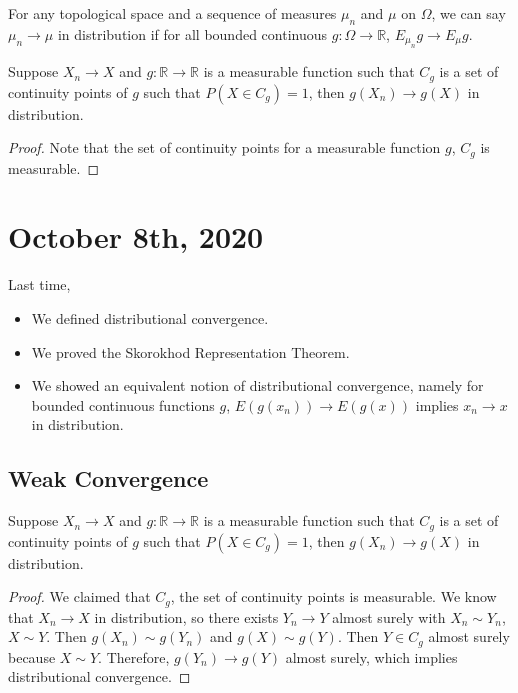 \documentclass[11pt]{scrartcl}
\newcommand{\R}{\mathbb{R}}
\begin{document}
For any topological space and a sequence of measures $\mu_n$ and $\mu$ on $\Omega$, we can say $\mu_n \rightarrow \mu$ in distribution if for all bounded continuous $g : \Omega \rightarrow \R$, $E_{\mu_n}g \rightarrow E_\mu g$.

\begin{thm} Suppose $X_n \rightarrow X$ and $g: \R \rightarrow \R$ is a measurable function such that $C_g$ is a set of continuity points of $g$ such that $P(X \in C_g) = 1$, then $g(X_n) \rightarrow g(X)$ in distribution.
\end{thm}
\begin{proof}
Note that the set of continuity points for a measurable function $g$, $C_g$ is measurable.
\end{proof}
\pagebreak
\section{October 8th, 2020}
Last time,
\begin{itemize}
\item We defined distributional convergence.
\item We proved the Skorokhod Representation Theorem.
\item We showed an equivalent notion of distributional convergence, namely for bounded continuous functions $g$, $E(g(x_n)) \rightarrow E(g(x))$ implies $x_n \rightarrow x$ in distribution.
\end{itemize}
\subsection{Weak Convergence}
\begin{thm} Suppose $X_n \rightarrow X$ and $g: \R \rightarrow \R$ is a measurable function such that $C_g$ is a set of continuity points of $g$ such that $P(X \in C_g) = 1$, then $g(X_n) \rightarrow g(X)$ in distribution.
\end{thm}
\begin{proof}
We claimed that $C_g$, the set of continuity points is measurable.  We know that $X_n \rightarrow X$ in distribution, so there exists $Y_n \rightarrow Y$ almost surely with $X_n \sim Y_n$, $X \sim Y$.  Then $g(X_n) \sim g(Y_n)$ and $g(X) \sim g(Y)$.  Then $Y \in C_g$ almost surely because $X \sim Y$.  Therefore, $g(Y_n) \to g(Y)$ almost surely, which implies distributional convergence.  
\end{proof}
\end{document}
